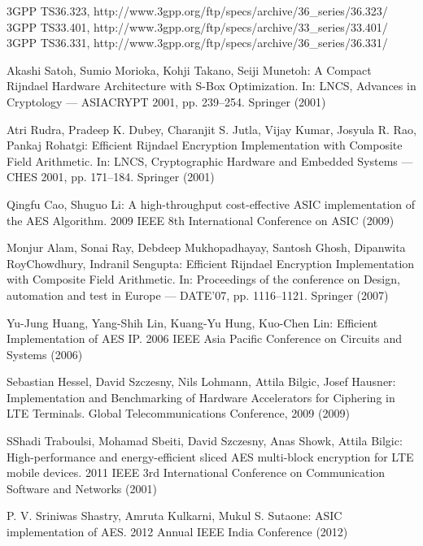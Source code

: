 \documentclass[lnicst,sechang,a4paper]{svmultln}
\begin{document}
\begin{thebibliography}{4}

 3GPP TS36.323, http://www.3gpp.org/ftp/specs/archive/36\_series/36.323/
 3GPP TS33.401, http://www.3gpp.org/ftp/specs/archive/33\_series/33.401/
 3GPP TS36.331, http://www.3gpp.org/ftp/specs/archive/36\_series/36.331/

 Akashi Satoh, Sumio Morioka, Kohji Takano, Seiji Munetoh: A Compact Rijndael Hardware Architecture with S-Box Optimization. In: LNCS, Advances in Cryptology — ASIACRYPT 2001, pp. 239--254. Springer (2001)


 Atri Rudra, Pradeep K. Dubey, Charanjit S. Jutla, Vijay Kumar, Josyula R. Rao, Pankaj Rohatgi: Efficient Rijndael Encryption Implementation with Composite Field Arithmetic. In: LNCS, Cryptographic Hardware and Embedded Systems — CHES 2001, pp. 171--184. Springer (2001)


 Qingfu Cao, Shuguo Li: A high-throughput cost-effective ASIC implementation of the AES Algorithm. 2009 IEEE 8th International Conference on ASIC (2009)


 Monjur Alam, Sonai Ray,	Debdeep Mukhopadhayay, Santosh Ghosh,  Dipanwita RoyChowdhury, Indranil Sengupta: Efficient Rijndael Encryption Implementation with Composite Field Arithmetic. In: Proceedings of the conference on Design, automation and test in Europe
 — DATE'07, pp. 1116--1121. Springer (2007)


 Yu-Jung Huang, Yang-Shih Lin,  Kuang-Yu Hung, Kuo-Chen Lin: Efficient Implementation of AES IP. 2006 IEEE Asia Pacific Conference on Circuits and Systems (2006)

 Sebastian Hessel, David Szczesny, Nils Lohmann, Attila Bilgic, Josef Hausner: Implementation and Benchmarking of Hardware Accelerators for Ciphering in LTE Terminals. Global Telecommunications Conference, 2009 (2009)

 SShadi Traboulsi, Mohamad Sbeiti, David Szczesny, Anas Showk, Attila Bilgic: High-performance and energy-efficient sliced AES multi-block encryption for LTE mobile devices. 2011 IEEE 3rd International Conference on Communication Software and Networks (2001)


 P. V. Sriniwas Shastry, Amruta Kulkarni, Mukul S. Sutaone: ASIC implementation of AES. 2012 Annual IEEE India Conference  (2012)


\end{thebibliography}
\end{document}
